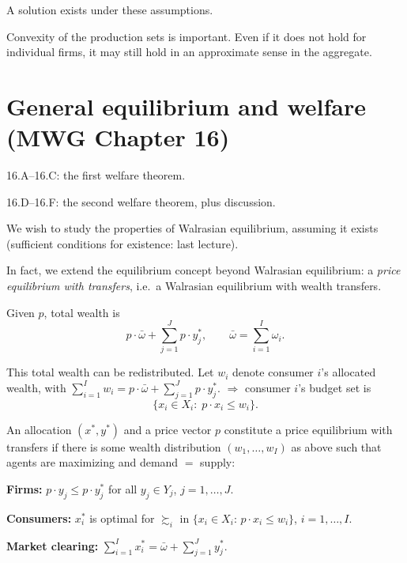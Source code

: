 \documentclass[11pt]{article}
\begin{document}
\begin{flatlist}
  \item A solution exists under these assumptions.
  \item Convexity of the production sets is important. Even if it does not hold for
        individual firms, it may still hold in an approximate sense in the aggregate.
\end{flatlist}


\section{General equilibrium and welfare (MWG Chapter 16)}

\begin{flatlist}
  \item 16.A--16.C: the first welfare theorem.
  \item 16.D--16.F: the second welfare theorem, plus discussion.
\end{flatlist}

We wish to study the properties of Walrasian equilibrium, assuming it exists (sufficient
conditions for existence: last lecture).

In fact, we extend the equilibrium concept beyond Walrasian equilibrium: a \emph{price
equilibrium with transfers}, i.e.\ a Walrasian equilibrium with wealth transfers.

\begin{flatlist}
  \item Given $p$, total wealth is
        \[ p\cdot\bar\omega+\sum_{j=1}^{J}p\cdot y_j^*, \qquad
           \bar\omega=\sum_{i=1}^{I}\omega_i . \]
  \item This total wealth can be redistributed. Let $w_i$ denote consumer $i$'s allocated
        wealth, with $\sum_{i=1}^{I}w_i=p\cdot\bar\omega+\sum_{j=1}^{J}p\cdot y_j^*$.
        $\Rightarrow$ consumer $i$'s budget set is
        \[ \{x_i\in X_i:\; p\cdot x_i\le w_i\}. \]
\end{flatlist}

An allocation $(x^*,y^*)$ and a price vector $p$ constitute a price equilibrium with
transfers if there is some wealth distribution $(w_1,\dots,w_I)$ as above such that agents
are maximizing and demand $=$ supply:
\begin{flatnum}
  \item \textbf{Firms:} $p\cdot y_j\le p\cdot y_j^*$ for all $y_j\in Y_j$, $j=1,\dots,J$.
  \item \textbf{Consumers:} $x_i^*$ is optimal for $\succsim_i$ in
        $\{x_i\in X_i:\,p\cdot x_i\le w_i\}$, $i=1,\dots,I$.
  \item \textbf{Market clearing:} $\displaystyle\sum_{i=1}^{I}x_i^*=\bar\omega+\sum_{j=1}^{J}y_j^*$.
\end{flatnum}
\end{document}

